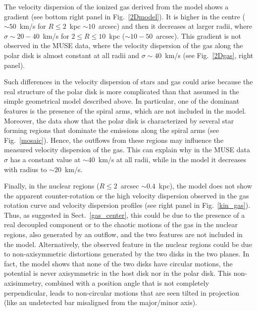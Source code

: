 \documentclass{aa}
\begin{document}
  The velocity dispersion of the ionized gas derived from the model
  shows a gradient (see bottom right panel in Fig.~\ref{2Dmodel}). It
  is higher in the centre ($\sim 50$~km/s for $R \le 2$~kpc
  $\sim 10$~arcsec) and then it decreases at larger radii, where
  $\sigma \sim 20 - 40$~km/s for $2 \le R \le 10$~kpc
  ($\sim 10-50$~arcsec). This gradient is not observed in the MUSE
  data, where the velocity dispersion of the gas along the polar disk
  is almost constant at all radii and $\sigma \sim 40$~km/s (see
  Fig.~\ref{2Dgas}, right panel). 

  Such differences in the velocity dispersion of stars and gas 
  could arise because the real structure of the polar disk
  is more complicated than that assumed in the simple geometrical
  model described above. In particular, one of the dominant features is
  the presence of the spiral arms, which are not included in the
  model. Moreover, the data show that the polar disk is characterized
  by several star forming regions that dominate the emissions along
  the spiral arms (see Fig.~\ref{mosaic}). Hence, the outflows from
  these regions may influence the measured velocity dispersion of the
  gas. This can explain why in the MUSE data $\sigma$ has a constant value at
  $\sim 40$~km/s at all radii, while in the model it decreases with radius to
  $\sim 20$~km/s.

  Finally, in the nuclear regions ($R\le 2$~arcsec $\sim 0.4$~kpc),
  the model does not show the apparent counter-rotation or the
  high velocity dispersion observed in the gas rotation curve and
  velocity dispersion profiles (see right panel in  Fig.~\ref{kin_gas}).  Thus, as suggested in Sect.~\ref{gas_center},
  this could be due to the presence of a real decoupled component or
  to the chaotic motions of the gas in the nuclear regions, also
  generated by an outflow, and the two features are not included in the
  model. Alternatively, the observed feature in the nuclear regions
  could be due to non-axisymmetric distortions generated by the two
  disks in the two planes. In fact, the model shows that none of
  the two disks have circular motions, the potential is never
  axisymmetric  in the host disk nor in the polar disk. This
  non-axisimmetry, combined with a position angle that is  not completely
  perpendicular, leads to non-circular motions that are seen tilted in
  projection (like an undetected bar misaligned from the major/minor
  axis).
\end{document}
